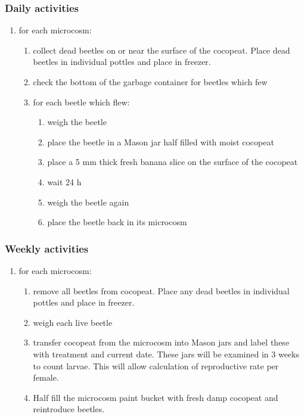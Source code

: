 \documentclass[twocolumn, 12pt,letterpaper,english,bibliography=totocnumbered, abstract=on]{scrartcl}
\begin{document}
\subsubsection{Daily activities}

\begin{enumerate}
	\item for each microcosm:
	\begin{enumerate}
        \item collect dead beetles on or near the surface of the cocopeat. Place dead beetles in individual pottles and place in freezer.
        \item check the bottom of the garbage container for beetles which few	
        \item for each beetle which flew:
        \begin{enumerate}
            \item weigh the beetle
            \item place the beetle in a Mason jar half filled with moist cocopeat
            \item place a 5 mm thick fresh banana slice on the surface of the cocopeat
            \item wait 24 h
            \item weigh the beetle again
            \item place the beetle back in its microcosm
        \end{enumerate}
    \end{enumerate}	   
\end{enumerate}

\subsubsection{Weekly activities}

\begin{enumerate}	
    \item for each microcosm:
    \begin{enumerate}
        \item remove all beetles from cocopeat. Place any dead beetles in individual pottles and place in freezer.
        \item weigh each live beetle
		\item transfer cocopeat from the microcosm into Mason jars and label these with treatment and current date. These jars will be examined in 3 weeks to count larvae. This will allow calculation of reproductive rate per female.
		\item Half fill the microcosm paint bucket with fresh damp cocopeat and reintroduce beetles.
    \end{enumerate} 
\end{enumerate}

\pagebreak
\printbibliography
\end{document}
